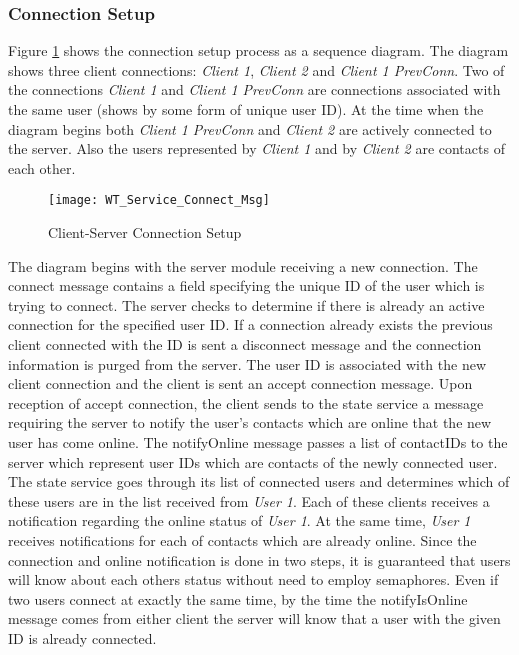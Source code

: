 \subsubsection*{Connection Setup}

Figure \ref{fig:connsetupseqdiag} shows the connection setup process as a sequence diagram. The diagram shows three client connections: \textit{Client 1}, \textit{Client 2} and \textit{Client 1 PrevConn}. Two of the connections \textit{Client 1} and \textit{Client 1 PrevConn} are connections associated with the same user (shows by some form of unique user ID). At the time when the diagram begins both \textit{Client 1 PrevConn} and \textit{Client 2} are actively connected to the server. Also the users represented by \textit{Client 1} and by \textit{Client 2} are contacts of each other.

\begin{figure}
	\centering
	\texttt{[image: WT\_Service\_Connect\_Msg]}
	\caption{Client-Server Connection Setup}
	\label{fig:connsetupseqdiag}
\end{figure}

The diagram begins with the server module receiving a new connection. The connect message contains a field specifying the unique ID of the user which is trying to connect. The server checks to determine if there is already an active connection for the specified user ID. If a connection already exists the previous client connected with the ID is sent a disconnect message and the connection information is purged from the server. The user ID is associated with the new client connection and the client is sent an accept connection message. Upon reception of accept connection, the client sends to the state service a message requiring the server to notify the user's contacts which are online that the new user has come online. The notifyOnline message passes a list of contactIDs to the server which represent user IDs which are contacts of the newly connected user. The state service goes through its list of connected users and determines which of these users are in the list received from \textit{User 1}. Each of these clients receives a notification regarding the online status of \textit{User 1}. At the same time, \textit{User 1} receives notifications for each of contacts which are already online. Since the connection and online notification is done in two steps, it is guaranteed that users will know about each others status without need to employ semaphores. Even if two users connect at exactly the same time, by the time the notifyIsOnline message comes from either client the server will know that a user with the given ID is already connected.

